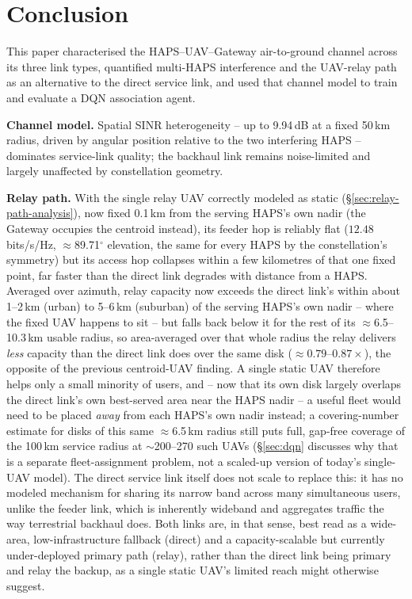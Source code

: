 \documentclass[]{ieeeaccess}
\begin{document}
\section{Conclusion}
\label{sec:conclusion}

This paper characterised the HAPS--UAV--Gateway air-to-ground channel across its three link types, quantified multi-HAPS interference and the UAV-relay path as an alternative to the direct service link, and used that channel model to train and evaluate a DQN association agent.

\textbf{Channel model.} Spatial SINR heterogeneity -- up to 9.94\,dB at a fixed 50\,km radius, driven by angular position relative to the two interfering HAPS -- dominates service-link quality; the backhaul link remains noise-limited and largely unaffected by constellation geometry.

\textbf{Relay path.} With the single relay UAV correctly modeled as static (\S\ref{sec:relay-path-analysis}), now fixed 0.1\,km from the serving HAPS's own nadir (the Gateway occupies the centroid instead), its feeder hop is reliably flat ($12.48$\,bits/s/Hz, $\approx$89.71$^\circ$ elevation, the same for every HAPS by the constellation's symmetry) but its access hop collapses within a few kilometres of that one fixed point, far faster than the direct link degrades with distance from a HAPS. Averaged over azimuth, relay capacity now exceeds the direct link's within about 1--2\,km (urban) to 5--6\,km (suburban) of the serving HAPS's own nadir -- where the fixed UAV happens to sit -- but falls back below it for the rest of its $\approx$6.5--10.3\,km usable radius, so area-averaged over that whole radius the relay delivers \emph{less} capacity than the direct link does over the same disk ($\approx0.79$--$0.87\times$), the opposite of the previous centroid-UAV finding. A single static UAV therefore helps only a small minority of users, and -- now that its own disk largely overlaps the direct link's own best-served area near the HAPS nadir -- a useful fleet would need to be placed \emph{away} from each HAPS's own nadir instead; a covering-number estimate for disks of this same $\approx$6.5\,km radius still puts full, gap-free coverage of the 100\,km service radius at $\sim$200--270 such UAVs (\S\ref{sec:dqn} discusses why that is a separate fleet-assignment problem, not a scaled-up version of today's single-UAV model). The direct service link itself does not scale to replace this: it has no modeled mechanism for sharing its narrow band across many simultaneous users, unlike the feeder link, which is inherently wideband and aggregates traffic the way terrestrial backhaul does. Both links are, in that sense, best read as a wide-area, low-infrastructure fallback (direct) and a capacity-scalable but currently under-deployed primary path (relay), rather than the direct link being primary and relay the backup, as a single static UAV's limited reach might otherwise suggest.
\end{document}
